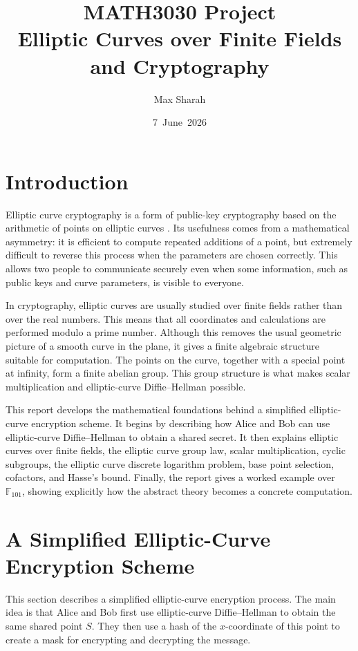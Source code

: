 \documentclass[12pt,a4paper]{article}
\title{MATH3030 Project\\Elliptic Curves over Finite Fields and Cryptography}
\author{Max Sharah}
\date{7~June~2026}
\begin{document}
\maketitle
\section{Introduction}
Elliptic curve cryptography is a form of public-key cryptography based on the arithmetic of points on elliptic curves \cite{koblitz1987,trappe-washington2006,nist800186}. Its usefulness comes from a mathematical asymmetry: it is efficient to compute repeated additions of a point, but extremely difficult to reverse this process when the parameters are chosen correctly. This allows two people to communicate securely even when some information, such as public keys and curve parameters, is visible to everyone.

In cryptography, elliptic curves are usually studied over finite fields rather than over the real numbers. This means that all coordinates and calculations are performed modulo a prime number. Although this removes the usual geometric picture of a smooth curve in the plane, it gives a finite algebraic structure suitable for computation. The points on the curve, together with a special point at infinity, form a finite abelian group. This group structure is what makes scalar multiplication and elliptic-curve Diffie--Hellman possible.

This report develops the mathematical foundations behind a simplified elliptic-curve encryption scheme. It begins by describing how Alice and Bob can use elliptic-curve Diffie--Hellman to obtain a shared secret. It then explains elliptic curves over finite fields, the elliptic curve group law, scalar multiplication, cyclic subgroups, the elliptic curve discrete logarithm problem, base point selection, cofactors, and Hasse's bound. Finally, the report gives a worked example over \(\mathbb{F}_{101}\), showing explicitly how the abstract theory becomes a concrete computation.

\section{A Simplified Elliptic-Curve Encryption Scheme}


This section describes a simplified elliptic-curve encryption process. The main idea is that Alice and Bob first use elliptic-curve Diffie--Hellman to obtain the same shared point \(S\). They then use a hash of the \(x\)-coordinate of this point to create a mask for encrypting and decrypting the message.
\end{document}
